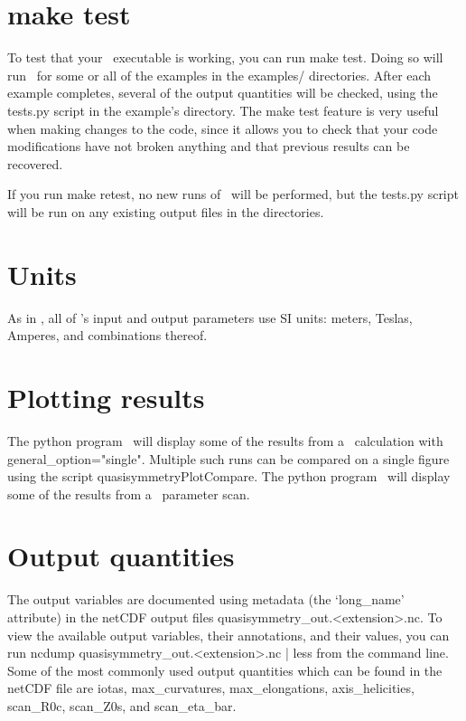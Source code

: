 \section{\ttfamily make test}

To test that your \quasisymmetry~executable is working, you can run {\ttfamily make test}.  Doing so will run
\quasisymmetry~for some or all of the examples in the {\ttfamily examples/} directories.
After each example completes, several of the output quantities
will be checked, using the
{\ttfamily tests.py} script in the example's directory.
The {\ttfamily make test} feature is very useful when making changes to the code, since it allows you to check
that your code modifications have not broken anything and that previous results
can be recovered.

If you run {\ttfamily make retest},
no new runs of \quasisymmetry~will be performed, but the {\ttfamily tests.py} script
will be run on any existing output files in the  directories.

\section{Units}

As in \vmec, all of \quasisymmetry's input and output parameters use SI units: meters, Teslas, Amperes, and combinations thereof.

\section{Plotting results}

The python program \quasisymmetryPlotSingle~will display some of the results from a \quasisymmetry~calculation with {\ttfamily general\_option="single"}.
Multiple such runs can be compared on a single figure using the script {\ttfamily quasisymmetryPlotCompare}.
The python program \quasisymmetryPlotScan~will display some of the results from a \quasisymmetry~parameter scan.

\section{Output quantities}

The output variables are documented using metadata (the `{\ttfamily long\_name}' attribute)
in the netCDF output files {\ttfamily quasisymmetry\_out.<extension>.nc}.
To view the available output variables, their annotations, and their values, you can run
{\ttfamily ncdump quasisymmetry\_out.<extension>.nc | less} from the command line.
Some of the most commonly used output quantities which can be found in the netCDF file are 
{\ttfamily iotas},
{\ttfamily max\_curvatures},
{\ttfamily max\_elongations},
{\ttfamily axis\_helicities},
{\ttfamily scan\_R0c},
{\ttfamily scan\_Z0s},
and
{\ttfamily scan\_eta\_bar}.

